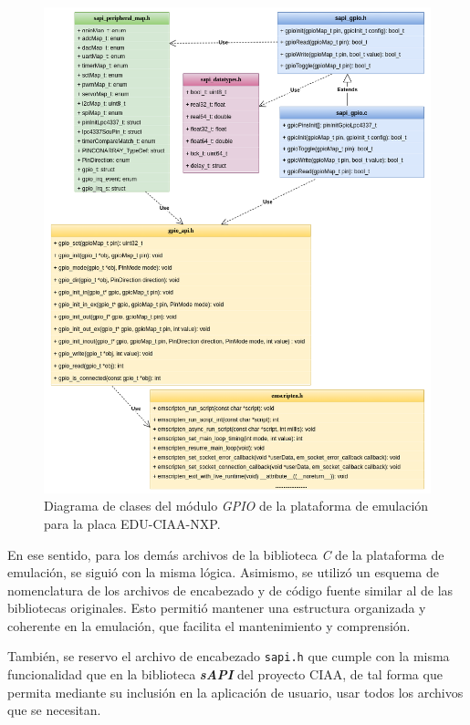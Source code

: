 \hfill \break
\hfill \break
\hfill \break
\hfill \break
\hfill \break
\hfill \break
\hfill \break

\begin{figure}[ht]
	\centering
	\includegraphics[scale=.41]{./Figures/DiagramaClasesEmulador.png}
	\caption{Diagrama de clases del módulo \textit{GPIO} de la plataforma de emulación para la placa EDU-CIAA-NXP.}
	\label{fig:GPIOEmulador}
\end{figure}


En ese sentido, para los demás archivos de la biblioteca \textit{C} de la plataforma de emulación, se siguió con la misma lógica. Asimismo, se utilizó un esquema de nomenclatura de los archivos de encabezado y de código fuente similar al de las bibliotecas originales.  Esto permitió mantener una estructura organizada y coherente en la emulación, que facilita el mantenimiento y comprensión.


También, se reservo el archivo de encabezado \texttt{sapi.h} que cumple con la misma funcionalidad que en la biblioteca \textit{\textbf{sAPI}} del proyecto CIAA, de tal forma que permita mediante su inclusión en la aplicación de usuario, usar todos los archivos que se necesitan.  

